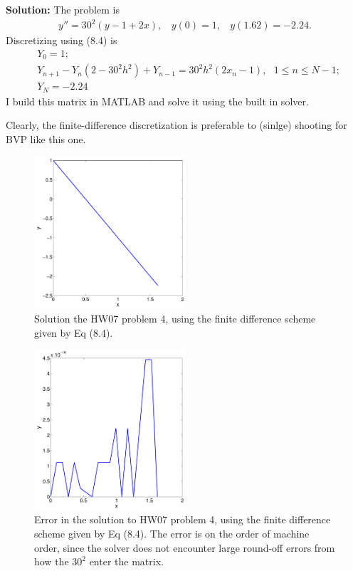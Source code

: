 \documentclass[11pt]{article}
\begin{document}
\begin{enumerate}
\bigskip
\textbf{Solution:} The problem is
\begin{align*} y'' = 30^2 (y - 1 + 2x), ~~~~y(0) = 1, ~~~~y(1.62) = -2.24.\end{align*}
Discretizing using (8.4) is 
\begin{align*} &Y_0 = 1;\\
&Y_{n+1} - Y_n (2-30^2h^2) + Y_{n-1} = 30^2 h^2 (2x_n -1 ) , ~~~1\leq n \leq N-1;\\
&Y_N = -2.24\end{align*}
I build this matrix in MATLAB and solve it using the built in solver.

Clearly, the finite-difference discretization is preferable to (sinlge) shooting for BVP like this one.



\begin{figure}[h!]
  \centering
    \includegraphics[width=0.5\textwidth]{andy_hw08_prb05_01.pdf}
  \caption{Solution the HW07 problem 4, using the finite difference scheme given by Eq (8.4).}
\end{figure}

\begin{figure}[h!]
  \centering
    \includegraphics[width=0.5\textwidth]{andy_hw08_prb05_error.pdf}
  \caption{Error in the solution to HW07 problem 4, using the finite difference scheme given by Eq (8.4). The error is on the order of machine order, since the solver does not encounter large round-off errors from how the $30^2$ enter the matrix.}
\end{figure}


\end{enumerate}
\end{document}

